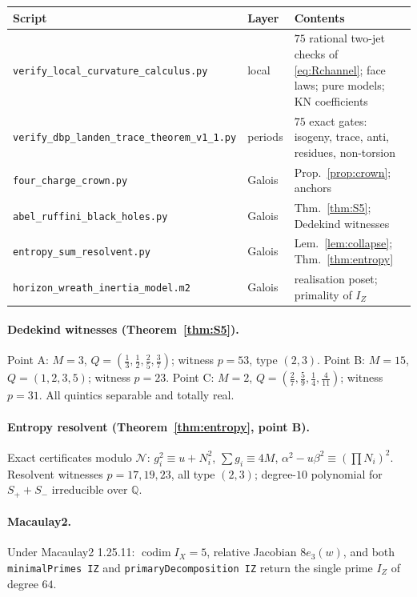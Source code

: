 \documentclass[11pt,a4paper]{article}
\theoremstyle{definition}
\theoremstyle{remark}
\newcommand{\Q}{\mathbb{Q}}
\begin{document}
{\small
\begin{center}
\begin{tabular}{@{}llp{}@{}}
\toprule
Script & Layer & Contents\\
\midrule
\texttt{verify\_local\_curvature\_calculus.py}
  & local
  & \(75\) rational two-jet checks of \eqref{eq:Rchannel}; face laws;
    pure models; KN coefficients\\
\texttt{verify\_dbp\_landen\_trace\_theorem\_v1\_1.py}
  & periods
  & \(75\) exact gates: isogeny, trace, anti, residues, non-torsion\\
\texttt{four\_charge\_crown.py}
  & Galois
  & Prop.~\ref{prop:crown}; anchors\\
\texttt{abel\_ruffini\_black\_holes.py}
  & Galois
  & Thm.~\ref{thm:S5}; Dedekind witnesses\\
\texttt{entropy\_sum\_resolvent.py}
  & Galois
  & Lem.~\ref{lem:collapse}; Thm.~\ref{thm:entropy}\\
\texttt{horizon\_wreath\_inertia\_model.m2}
  & Galois
  & realisation poset; primality of \(I_Z\)\\
\bottomrule
\end{tabular}
\end{center}
}

\paragraph{Dedekind witnesses (Theorem~\ref{thm:S5}).}
Point A: \(M=3\), \(Q=(\tfrac13,\tfrac12,\tfrac25,\tfrac37)\); witness \(p=53\),
type \((2,3)\). Point B: \(M=15\), \(Q=(1,2,3,5)\); witness \(p=23\). Point C:
\(M=2\), \(Q=(\tfrac27,\tfrac59,\tfrac14,\tfrac4{11})\); witness \(p=31\). All
quintics separable and totally real.

\paragraph{Entropy resolvent (Theorem~\ref{thm:entropy}, point B).}
Exact certificates modulo \(\mathcal N\): \(g_i^2\equiv u+N_i^2\),
\(\sum g_i\equiv4M\), \(\alpha^2-u\beta^2\equiv(\prod N_i)^2\). Resolvent
witnesses \(p=17,19,23\), all type \((2,3)\); degree-\(10\) polynomial for
\(S_++S_-\) irreducible over \(\Q\).

\paragraph{Macaulay2.}
Under Macaulay2 1.25.11: \(\operatorname{codim}I_X=5\), relative Jacobian
\(8e_3(w)\), and both \texttt{minimalPrimes IZ} and
\texttt{primaryDecomposition IZ} return the single prime \(I_Z\) of degree
\(64\).
\end{document}
